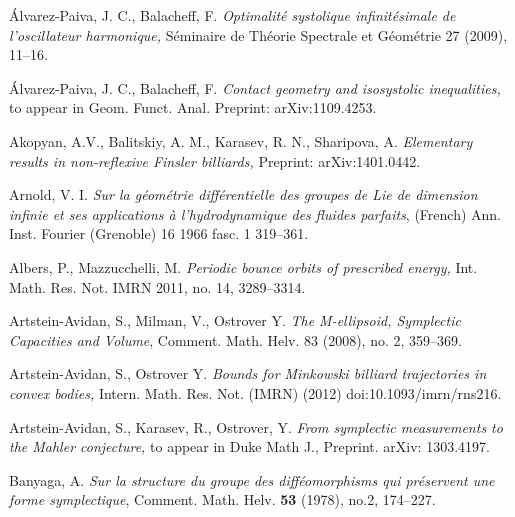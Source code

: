 \documentclass{icmart}
\theoremstyle{definition}
\begin{document}
%

%


\begin{thebibliography}{7}

  \'Alvarez-Paiva, J. C., Balacheff, F. {\it Optimalit\'e systolique infinit\'esimale de l'oscillateur harmonique,} S\'eminaire de Th\'eorie Spectrale et G\'eom\'etrie 27 (2009), 11--16.

  \'Alvarez-Paiva, J. C., Balacheff, F. {\it Contact geometry and isosystolic inequalities,} to appear in Geom. Funct. Anal. Preprint: arXiv:1109.4253.


 Akopyan, A.V., Balitskiy, A. M., Karasev, R. N., Sharipova, A. {\it Elementary results in non-reflexive Finsler billiards,} Preprint: arXiv:1401.0442.



 Arnold, V. I. {\it Sur la g\'{e}om\'{e}trie diff\'{e}rentielle des groupes
de Lie de dimension infinie et ses applications \`{a}
l'hydrodynamique des fluides parfaits}, (French) Ann. Inst. Fourier
(Grenoble) 16 1966 fasc. 1 319--361.



 Albers, P.,  Mazzucchelli, M. {\it Periodic bounce orbits of prescribed energy, }
Int. Math. Res. Not. IMRN 2011, no. 14, 3289--3314. 

 Artstein-Avidan, S., Milman, V., Ostrover Y. {\it  The M-ellipsoid, Symplectic Capacities and Volume}, Comment. Math. Helv. 83 (2008), no. 2, 359--369.  %


 Artstein-Avidan, S., Ostrover Y. {\it  Bounds for Minkowski billiard trajectories in convex bodies,} 
Intern. Math. Res. Not. (IMRN) (2012) doi:10.1093/imrn/rns216.


 Artstein-Avidan, S., Karasev, R., Ostrover, Y. {\it From symplectic measurements to the Mahler
conjecture,} to appear in Duke Math J., Preprint. arXiv: 1303.4197.

 Banyaga, A.  {\it Sur la structure du groupe des
diff\'eomorphisms qui pr\'eservent une forme symplectique}, Comment.
Math. Helv. {\bf 53} (1978), no.2, 174--227.


\end{thebibliography}
\end{document}
